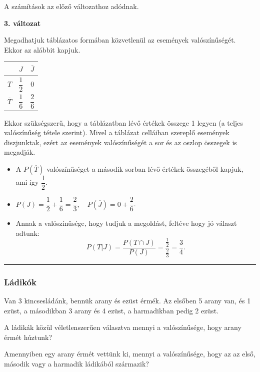 \documentclass[a4paper]{article}
\begin{document}
\medskip

A számítások az előző változathoz adódnak.

\noindent \textbf{3. változat}

\medskip

Megadhatjuk táblázatos formában közvetlenül az események valószínűségét. Ekkor az alábbit kapjuk.

\medskip

\begin{center}
\begin{tabular}{l|c|c|}
& $J$ & $\overline{J}$ \\
\hline
$T$ & $\dfrac{1}{2}$ & 0 \\
\hline
$\overline{T}$ & $\dfrac{1}{6}$ & $\dfrac{2}{6}$ \\
\hline
\end{tabular}
\end{center}

\medskip

Ekkor szükségszerű, hogy a táblázatban lévő értékek összege 1 legyen (a teljes valószínűség tétele szerint). Mivel a táblázat celláiban szereplő események diszjunktak, ezért az események valószínűségét a sor és az oszlop összegek is megadják.

\begin{itemize}
\item A $P(\overline{T})$ valószínűséget a második sorban lévő értékek összegéből kapjuk, ami így $\dfrac{1}{2}$.
\item $P(J) = \dfrac{1}{2} + \dfrac{1}{6} = \dfrac{2}{3}, \quad P(\overline{J}) = 0 + \dfrac{2}{6}$.
\item Annak a valószínűsége, hogy tudjuk a megoldást, feltéve hogy jó választ adtunk:
\[
P(T|J) = \dfrac{P(T \cap J)}{P(J)} =
\dfrac{\frac{1}{2}}{\frac{2}{3}} =
\dfrac{3}{4}.
\]
\end{itemize}

\hrule

\subsubsection{Ládikók}

Van 3 kincsesládánk, bennük arany és ezüst érmék.
Az elsőben 5 arany van, és 1 ezüst, a másodikban 3 arany és 4 ezüst, a harmadikban pedig 2 ezüst.

A ládikák közül véletlenszerűen választva mennyi a valószínűsége, hogy arany érmét húztunk?

Amennyiben egy arany érmét vettünk ki, mennyi a valószínűsége, hogy az az első, második vagy a harmadik ládikából származik?
\end{document}
